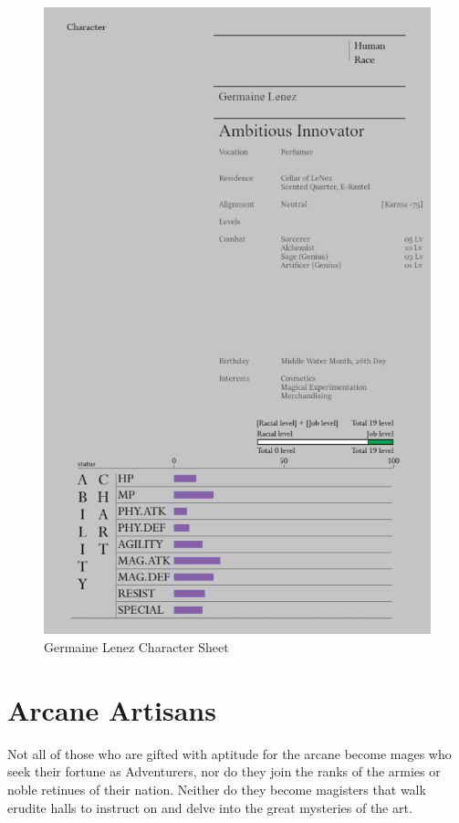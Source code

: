 

\begin{figure}
    \centering
    \includegraphics[width=1\linewidth]{V1 Birthright//images/ucThEId.png}
    \caption*{Germaine Lenez Character Sheet}
\end{figure}

\section*{Arcane Artisans}

Not all of those who are gifted with aptitude for the arcane become mages who seek their fortune as Adventurers, nor do they join the ranks of the armies or noble retinues of their nation. Neither do they become magisters that walk erudite halls to instruct on and delve into the great mysteries of the art.

